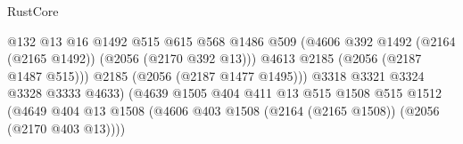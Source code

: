 \begin{lexlean}{RustCore}
\begin{coremodule}
                                                      @132
                                                      @13
                                                      @16
                                                      @1492
                                                      @515
                                                      @615
                                                      @568
                                                      @1486
                                                      @509
                                                      (@4606
                                                        @392
                                                        @1492
                                                        (@2164 (@2165 @1492))
                                                        (@2056 (@2170 @392 @13)))
                                                      @4613
                                                      @2185
                                                      (@2056 (@2187 @1487 @515)))
                                                    @2185
                                                    (@2056 (@2187 @1477 @1495)))
                                                  @3318
                                                  @3321
                                                  @3324
                                                  @3328
                                                  @3333
                                                  @4633)
                                                (@4639
                                                  @1505
                                                  @404
                                                  @411
                                                  @13
                                                  @515
                                                  @1508
                                                  @515
                                                  @1512
                                                  (@4649
                                                    @404
                                                    @13
                                                    @1508
                                                    (@4606
                                                      @403
                                                      @1508
                                                      (@2164 (@2165 @1508))
                                                      (@2056 (@2170 @403 @13))))

\end{coremodule}
\end{lexlean}
